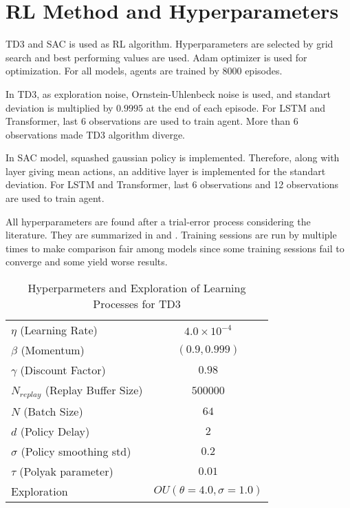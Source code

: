 \section{RL Method and Hyperparameters}
\label{sec:rlmethod}

TD3 and SAC is used as RL algorithm. 
Hyperparameters are selected by grid search and best performing values are used. Adam optimizer is used for optimization. 
For all models, agents are trained by 8000 episodes.

In TD3, as exploration noise, Ornstein-Uhlenbeck noise is used, and standart deviation is multiplied  by $0.9995$ at the end of each episode. For LSTM and Transformer, last 6 observations are used to train agent. 
More than 6 observations made TD3 algorithm diverge. 

In SAC model, squashed gaussian policy is implemented. 
Therefore, along with layer giving mean actions, an additive layer is implemented for the standart deviation. 
For LSTM and Transformer, last 6 observations and 12 observations are used to train agent. 

All hyperparameters are found after a trial-error process considering the literature. They  are summarized in  and . 
Training sessions are run by multiple times to make comparison fair among models since some training sessions fail to converge and some yield worse results.

\begin{table}
	\caption{Hyperparmeters and Exploration of Learning Processes for TD3}
	\begin{tabular}{|l||*{3}{c|}}\hline
		\backslashbox{Hyperparameter}{Model}
		&\makebox[5em]{RFFNN}&\makebox[5em]{LSTM}&\makebox[5em]{Transformer}\\\hline\hline
		$\eta$ (Learning Rate) & \multicolumn{3}{|c|}{$4.0\times10^{-4}$}\\\hline
		$\beta$ (Momentum) & \multicolumn{3}{|c|}{$(0.9, 0.999)$}\\\hline
		$\gamma$ (Discount Factor) & \multicolumn{3}{|c|}{$0.98$} \\\hline
		$N_{replay}$ (Replay Buffer Size) &\multicolumn{3}{|c|}{$500000$} \\\hline
		$N$ (Batch Size) &\multicolumn{3}{|c|}{$64$}\\\hline
		$d$ (Policy Delay) &\multicolumn{3}{|c|}{$2$}\\\hline
		$\sigma$ (Policy smoothing std) &\multicolumn{3}{|c|}{$0.2$}\\\hline
		$\tau$ (Polyak parameter) &\multicolumn{3}{|c|}{$0.01$}\\\hline
		Exploration &\multicolumn{3}{|c|}{$OU(\theta=4.0, \sigma=1.0)$}\\\hline
	\end{tabular}
	\label{table:hyperparams_td3}
\end{table}
\noindent

